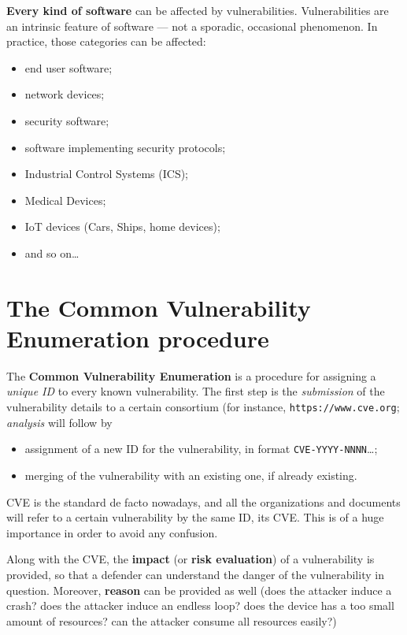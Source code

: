 \documentclass[10pt]{extreport}
\begin{document}
\textbf{Every kind of software} can be affected by vulnerabilities.
Vulnerabilities are an intrinsic feature of software --- not a sporadic,
occasional phenomenon. In practice, those categories can be affected:
\begin{itemize}
    \item end user software;
    \item network devices;
    \item security software;
    \item software implementing security protocols;
    \item Industrial Control Systems (ICS);
    \item Medical Devices;
    \item IoT devices (Cars, Ships, home devices);
    \item and so on\dots
\end{itemize}


\section{The Common Vulnerability Enumeration procedure}

The \textbf{Common Vulnerability Enumeration} is a procedure for assigning a
\emph{unique ID} to every known vulnerability. The first step is the
\emph{submission} of the vulnerability details to a certain consortium (for
instance, \texttt{https://\-www\-.cve.org}; \emph{analysis} will follow by
\begin{itemize}
    \item assignment of a new ID for the vulnerability, in format
        \texttt{CVE-YYYY-NNNN}\dots;
    \item merging of the vulnerability with an existing one, if already
        existing.
\end{itemize}

CVE is the standard de facto nowadays, and all the organizations and documents
will refer to a certain vulnerability by the same ID, its CVE. This is of a
huge importance in order to avoid any confusion.

Along with the CVE, the \textbf{impact} (or \textbf{risk evaluation}) of a
vulnerability is provided, so that a defender can understand the danger of the
vulnerability in question. Moreover, \textbf{reason} can be provided as well
(does the attacker induce a crash? does the attacker induce an endless loop?
does the device has a too small amount of resources? can the attacker consume
all resources easily?)
\end{document}
